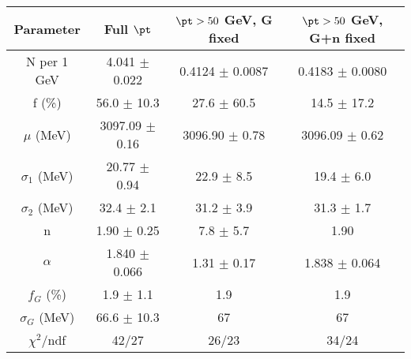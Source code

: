 \begin{tabular}{c||c|c|c}
Parameter & Full $\pt$ & $\pt>50$ GeV, G fixed & $\pt>50$ GeV, G+n fixed \\
\hline
N per 1 GeV & 4.041 $\pm$ 0.022 & 0.4124 $\pm$ 0.0087 & 0.4183 $\pm$ 0.0080\\
f (\%) & 56.0 $\pm$ 10.3 & 27.6 $\pm$ 60.5 & 14.5 $\pm$ 17.2\\
$\mu$ (MeV) & 3097.09 $\pm$ 0.16 & 3096.90 $\pm$ 0.78 & 3096.09 $\pm$ 0.62\\
$\sigma_1$ (MeV) & 20.77 $\pm$ 0.94 & 22.9 $\pm$ 8.5 & 19.4 $\pm$ 6.0\\
$\sigma_2$ (MeV) & 32.4 $\pm$ 2.1 & 31.2 $\pm$ 3.9 & 31.3 $\pm$ 1.7\\
n & 1.90 $\pm$ 0.25 & 7.8 $\pm$ 5.7 & 1.90\\
$\alpha$ & 1.840 $\pm$ 0.066 & 1.31 $\pm$ 0.17 & 1.838 $\pm$ 0.064\\
$f_G$ (\%) & 1.9 $\pm$ 1.1 & 1.9 & 1.9\\
$\sigma_G$ (MeV) & 66.6 $\pm$ 10.3 & 67 & 67\\
\hline
$\chi^2$/ndf & 42/27 & 26/23 & 34/24\\
\end{tabular}
